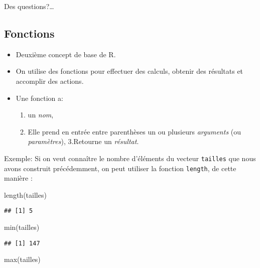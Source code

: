 \documentclass[
]{article}
\newenvironment{Shaded}{\begin{snugshade}}{\end{snugshade}}
\newcommand{\FunctionTok}[1]{\textcolor[rgb]{0.00,0.00,0.00}{#1}}
\newcommand{\NormalTok}[1]{#1}
\providecommand{\tightlist}{%
  \setlength{\itemsep}{0pt}\setlength{\parskip}{0pt}}
\begin{document}
Des questions?\ldots{}

\hypertarget{fonctions}{%
\subsection{Fonctions}\label{fonctions}}

\begin{itemize}
\item
  Deuxième concept de base de R.
\item
  On utilise des fonctions pour effectuer des calculs, obtenir des
  résultats et accomplir des actions.
\item
  Une fonction a:

  \begin{enumerate}
  \def\labelenumi{\arabic{enumi}.}
  \tightlist
  \item
    un \emph{nom},
  \item
    Elle prend en entrée entre parenthèses un ou plusieurs
    \emph{arguments} (ou \emph{paramètres}), 3.Retourne un
    \emph{résultat}.
  \end{enumerate}
\end{itemize}

Exemple: Si on veut connaître le nombre d'éléments du vecteur
\texttt{tailles} que nous avons construit précédemment, on peut utiliser
la fonction \texttt{length}, de cette manière :

\begin{Shaded}
\begin{Highlighting}[]
\FunctionTok{length}\NormalTok{(tailles)}
\end{Highlighting}
\end{Shaded}

\begin{verbatim}
## [1] 5
\end{verbatim}

\begin{Shaded}
\begin{Highlighting}[]
\FunctionTok{min}\NormalTok{(tailles)}
\end{Highlighting}
\end{Shaded}

\begin{verbatim}
## [1] 147
\end{verbatim}

\begin{Shaded}
\begin{Highlighting}[]
\FunctionTok{max}\NormalTok{(tailles)}
\end{Highlighting}
\end{Shaded}
\end{document}
